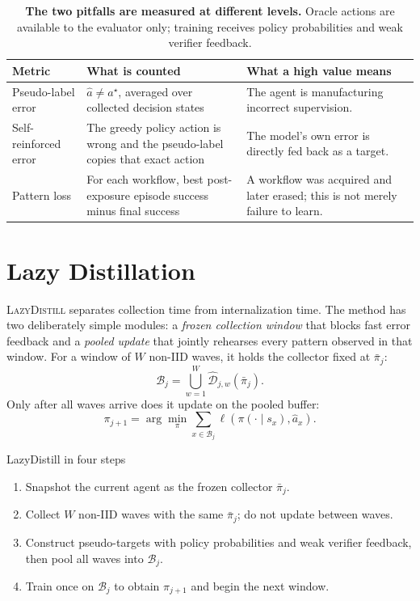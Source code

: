 \documentclass[10pt]{article}
\newcommand{\method}{\textsc{LazyDistill}}
\begin{document}
\begin{table}[t]
\centering
\small
\caption{\textbf{The two pitfalls are measured at different levels.}  Oracle
actions are available to the evaluator only; training receives policy
probabilities and weak verifier feedback.}
\label{tab:metrics}
\begin{tabular}{p{2.5cm}p{5.0cm}p{5.0cm}}
\toprule
Metric & What is counted & What a high value means\\
\midrule
Pseudo-label error &
$\hat a\neq a^\star$, averaged over collected decision states &
The agent is manufacturing incorrect supervision.\\
Self-reinforced error &
The greedy policy action is wrong and the pseudo-label copies that exact action &
The model's own error is directly fed back as a target.\\
Pattern loss &
For each workflow, best post-exposure episode success minus final success &
A workflow was acquired and later erased; this is not merely failure to learn.\\
\bottomrule
\end{tabular}
\end{table}

\section{Lazy Distillation}
\label{sec:method}

\method{} separates collection time from internalization time.  The method has
two deliberately simple modules: a \emph{frozen collection window} that blocks
fast error feedback and a \emph{pooled update} that jointly rehearses every
pattern observed in that window.  For a window of
$W$ non-IID waves, it holds the collector fixed at $\bar\pi_j$:
\begin{equation}
 \mathcal{B}_j=\bigcup_{w=1}^{W}
 \widehat{\mathcal{D}}_{j,w}(\bar\pi_j).
\end{equation}
Only after all waves arrive does it update on the pooled buffer:
\begin{equation}
\pi_{j+1}=\arg\min_\pi
 \sum_{x\in\mathcal{B}_j}
 \ell\!\left(\pi(\cdot\mid s_x),\hat a_x\right).
\end{equation}

\begin{storybox}{LazyDistill in four steps}
\begin{enumerate}[leftmargin=1.5em,itemsep=1pt,topsep=1pt]
\item Snapshot the current agent as the frozen collector $\bar\pi_j$.
\item Collect $W$ non-IID waves with the same $\bar\pi_j$; do not update between
waves.
\item Construct pseudo-targets with policy probabilities and weak verifier
feedback, then pool all waves into $\mathcal{B}_j$.
\item Train once on $\mathcal{B}_j$ to obtain $\pi_{j+1}$ and begin the next
window.
\end{enumerate}
\end{storybox}
\end{document}
